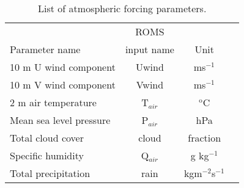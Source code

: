 \begin{table}[h]
 \begin{center}
  \caption{List of atmospheric forcing parameters.}
   \begin{tabular}{lccl}
   \hline
    					& ROMS			& 		\\
    Parameter name			& input name		& Unit		\\
   \hline
    10 m U wind component		& Uwind			& ms$^{-1}$	\\
    10 m V wind component 		& Vwind			& ms$^{-1}$	\\
    2 m air temperature			& T$_{air}$		& $^{\text{o}}$C	\\
    Mean sea level pressure		& P$_{air}$		& hPa		\\
    Total cloud cover			& cloud			& fraction		\\
    Specific humidity			& Q$_{air}$		& g kg$^{-1}$	\\
    Total precipitation			& rain			& kgm$^{-2}$s$^{-1}$		\\
   \hline
   \end{tabular}
  \label{tab:atmos_para}
 \end{center}
\end{table} 

